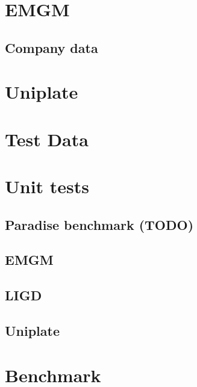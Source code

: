 \documentclass[abstracton,parskip=half]{scrreprt}
\begin{document}
    \section{EMGM}
    
    \subsection{Company data}
    
    \section{Uniplate}
    
    \section{Test Data}
    
    \section{Unit tests}
    \subsection{Paradise benchmark (TODO)}
    
    \subsection{EMGM}
    
    \subsection{LIGD}
    
    \subsection{Uniplate}
    

    \section{Benchmark}
    
\end{document}
